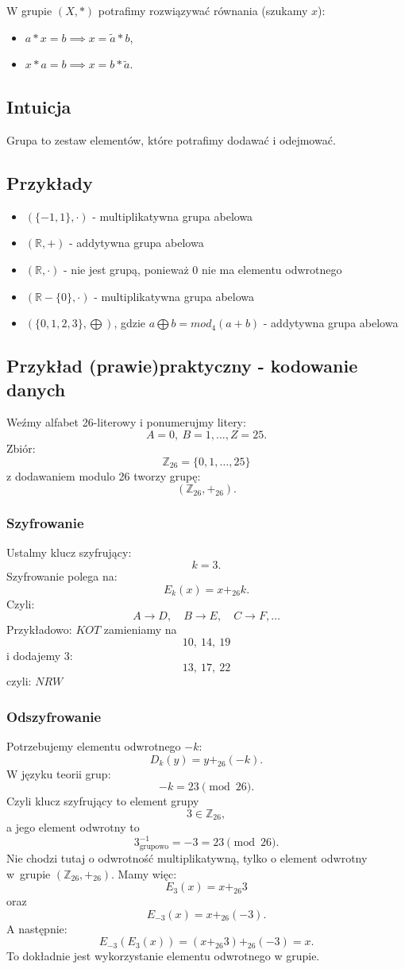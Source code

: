 \documentclass{article}
\begin{document}
W grupie $(X, *)$ potrafimy rozwiązywać równania (szukamy $x$):
\begin{itemize}
    \item $a * x = b \implies x = \tilde{a} * b$,
    \item $x * a = b \implies x = b * \tilde{a}$.
\end{itemize}

\subsection{Intuicja}
Grupa to zestaw elementów, które potrafimy dodawać i odejmować.

\subsection{Przykłady}
\begin{itemize}
    \item $(\{-1, 1\}, \cdot)$ - multiplikatywna grupa abelowa
    \item $(\mathbb{R}, +)$ - addytywna grupa abelowa
    \item $(\mathbb{R}, \cdot)$ - nie jest grupą, ponieważ 0 nie ma elementu odwrotnego
    \item $(\mathbb{R} - \{0\}, \cdot)$ - multiplikatywna grupa abelowa
    \item $(\{0, 1, 2, 3\}, \bigoplus)$, gdzie $a \bigoplus b = mod_{4}(a + b)$ - addytywna grupa abelowa
\end{itemize}

\subsection{Przykład (prawie)praktyczny - kodowanie danych}
Weźmy alfabet 26-literowy i ponumerujmy litery:
\[
    A=0,\ B=1,\ldots,Z=25.
\]
Zbiór:
\[
    \mathbb Z_{26}=\{0,1,\ldots,25\}
\]
z dodawaniem modulo 26 tworzy grupę:
\[
    (\mathbb Z_{26},+_{26}).
\]

\subsubsection{Szyfrowanie}
Ustalmy klucz szyfrujący:
\[
    k=3.
\]
Szyfrowanie polega na:
\[
    E_k(x)=x+_{26}k.
\]
Czyli:
\[
    A\rightarrow D,\quad
    B\rightarrow E,\quad
    C\rightarrow F,\ldots
\]
Przykładowo: $KOT$ zamieniamy na
\[
    10,\ 14,\ 19
\]
i dodajemy 3:
\[
    13,\ 17,\ 22
\]
czyli: $NRW$

\subsubsection{Odszyfrowanie}
Potrzebujemy elementu odwrotnego $-k$:
\[
    D_k(y)=y+_{26}(-k).
\]
W języku teorii grup:
\[
    -k=23\pmod{26}.
\]
Czyli klucz szyfrujący to element grupy
\[
    3\in\mathbb Z_{26},
\]
a jego element odwrotny to
\[
    3^{-1}_{\text{grupowo}}=-3=23\pmod{26}.
\]
Nie chodzi tutaj o odwrotność multiplikatywną, tylko o element odwrotny w~grupie
$(\mathbb Z_{26},+_{26})$. 
Mamy więc:
\[
    E_3(x)=x+_{26}3
\]
oraz
\[
    E_{-3}(x)=x+_{26}(-3).
\]
A następnie:
\[
    E_{-3}(E_3(x)) = (x+_{26}3)+_{26}(-3) = x.
\]
To dokładnie jest wykorzystanie elementu odwrotnego w grupie.
\end{document}
